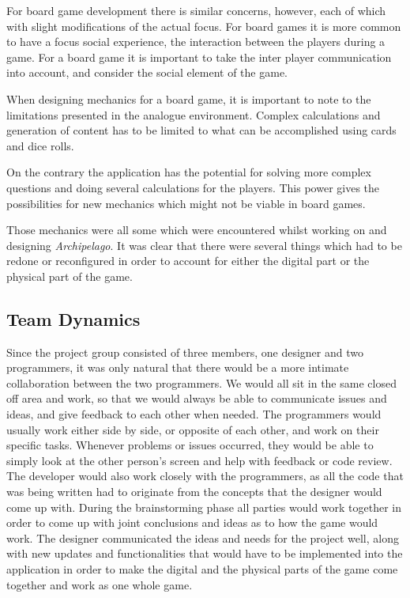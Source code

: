 For board game development there is similar concerns, however, each of which with slight modifications of the actual focus. For board games it is more common to have a focus social experience, the interaction between the players during a game. For a board game it is important to take the inter player communication into account, and consider the social element of the game. 

When designing mechanics for a board game, it is important to note to the limitations presented in the analogue environment. Complex calculations and generation of content has to be limited to what can be accomplished using cards and dice rolls.

On the contrary the application has the potential for solving more complex questions and doing several calculations for the players. This power gives the possibilities for new mechanics which might not be viable in board games. 

Those mechanics were all some which were encountered whilst working on and designing \textit{Archipelago}. It was clear that there were several things which had to be redone or reconfigured in order to account for either the digital part or the physical part of the game. 

\subsection{Team Dynamics}
Since the project group consisted of three members, one designer and two programmers, it was only natural that there would be a more intimate collaboration between the two programmers. We would all sit in the same closed off area and work, so that we would always be able to communicate issues and ideas, and give feedback to each other when needed. The programmers would usually work either side by side, or opposite of each other, and work on their specific tasks. Whenever problems or issues occurred, they would be able to simply look at the other person's screen and help with feedback or code review. The developer would also work closely with the programmers, as all the code that was being written had to originate from the concepts that the designer would come up with. During the brainstorming phase all parties would work together in order to come up with joint conclusions and ideas as to how the game would work. The designer communicated the ideas and needs for the project well, along with new updates and functionalities that would have to be implemented into the application in order to make the digital and the physical parts of the game come together and work as one whole game. 

